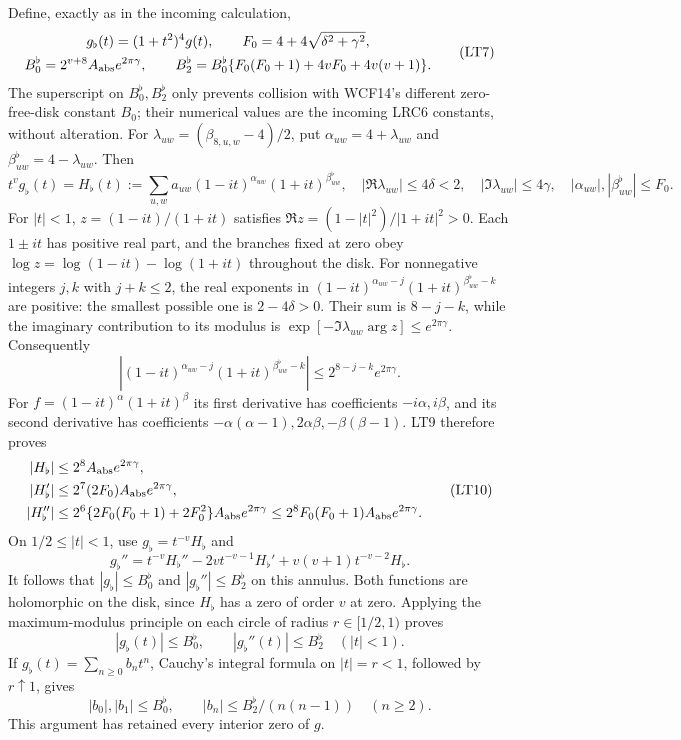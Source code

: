 Define, exactly as in the incoming calculation,
\[
\begin{gathered}
 g_\flat(t)=(1+t^2)^4g(t),\qquad
 F_0=4+4\sqrt{\delta^2+\gamma^2},\\
 B_0^{\flat}=2^{v+8}A_{\rm abs}e^{2\pi\gamma},\qquad
 B_2^{\flat}=B_0^{\flat}
 \{F_0(F_0+1)+4vF_0+4v(v+1)\}.
\end{gathered}                                                   \tag{LT7}
\]
The superscript on $B_0^{\flat},B_2^{\flat}$ only prevents collision
with WCF14's different zero-free-disk constant $B_0$; their numerical
values are the incoming LRC6 constants, without alteration.
For $\lambda_{uw}=(\beta_{8,u,w}-4)/2$, put
$\alpha_{uw}=4+\lambda_{uw}$ and $\beta^{\flat}_{uw}=4-\lambda_{uw}$.
Then
\[
 t^vg_\flat(t)=H_\flat(t):=
 \sum_{u,w}a_{uw}(1-it)^{\alpha_{uw}}(1+it)^{\beta^{\flat}_{uw}},
 \quad |\Re\lambda_{uw}|\le4\delta<2,
 \quad |\Im\lambda_{uw}|\le4\gamma,
 \quad |\alpha_{uw}|,|\beta^{\flat}_{uw}|\le F_0.            \tag{LT8}
\]
For $|t|<1$, $z=(1-it)/(1+it)$ satisfies
$\Re z=(1-|t|^2)/|1+it|^2>0$. Each $1\pm it$ has positive
real part, and the branches fixed at zero obey
$\log z=\log(1-it)-\log(1+it)$ throughout the disk.
For nonnegative integers $j,k$ with $j+k\le2$, the real exponents
in $(1-it)^{\alpha_{uw}-j}(1+it)^{\beta^{\flat}_{uw}-k}$ are
positive: the smallest possible one is $2-4\delta>0$.
Their sum is $8-j-k$, while the imaginary contribution to its
modulus is $\exp[-\Im\lambda_{uw}\arg z]\le e^{2\pi\gamma}$.
Consequently
\[
 |(1-it)^{\alpha_{uw}-j}(1+it)^{\beta^{\flat}_{uw}-k}|
 \le 2^{8-j-k}e^{2\pi\gamma}.                              \tag{LT9}
\]
For $f=(1-it)^\alpha(1+it)^\beta$ its first derivative has
coefficients $-i\alpha,i\beta$, and its second derivative has
coefficients $-\alpha(\alpha-1),2\alpha\beta,-\beta(\beta-1)$.
LT9 therefore proves
\[
\begin{split}
 |H_\flat|&\le2^8A_{\rm abs}e^{2\pi\gamma},\\
 |H_\flat'|&\le2^7(2F_0)A_{\rm abs}e^{2\pi\gamma},\\
 |H_\flat''|&\le2^6\{2F_0(F_0+1)+2F_0^2\}
                      A_{\rm abs}e^{2\pi\gamma}
 \le2^8F_0(F_0+1)A_{\rm abs}e^{2\pi\gamma}.
\end{split}                                                     \tag{LT10}
\]
On $1/2\le|t|<1$, use $g_\flat=t^{-v}H_\flat$ and
\[
 g_\flat''=t^{-v}H_\flat''-2vt^{-v-1}H_\flat'
                         +v(v+1)t^{-v-2}H_\flat .
\]
It follows that $|g_\flat|\le B_0^{\flat}$ and
$|g_\flat''|\le B_2^{\flat}$ on this annulus. Both functions
are holomorphic on the disk, since $H_\flat$ has a zero of order
$v$ at zero. Applying the maximum-modulus principle on each circle
of radius $r\in[1/2,1)$ proves
\[
 \boxed{|g_\flat(t)|\le B_0^{\flat},\qquad
 |g_\flat''(t)|\le B_2^{\flat}\quad(|t|<1).}              \tag{LRC6}
\]
If $g_\flat(t)=\sum_{n\ge0}b_nt^n$, Cauchy's integral formula
on $|t|=r<1$, followed by $r\uparrow1$, gives
\[
 |b_0|,|b_1|\le B_0^{\flat},\qquad
 |b_n|\le B_2^{\flat}/(n(n-1))\quad(n\ge2).               \tag{LT11}
\]
This argument has retained every interior zero of $g$.

